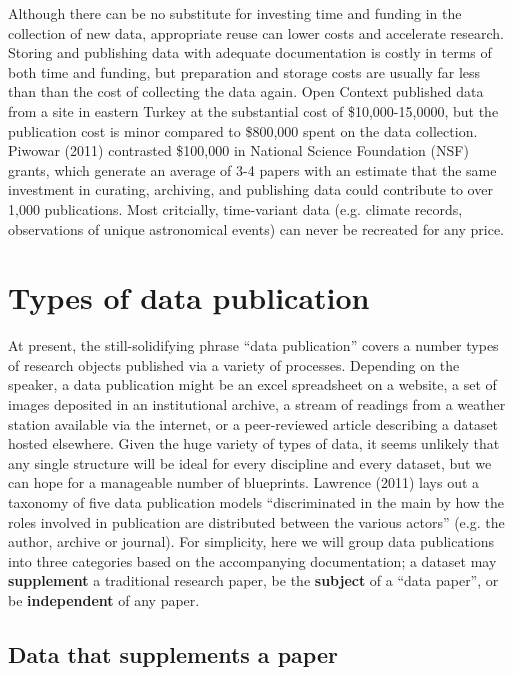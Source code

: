 \documentclass[10pt,twocolumn]{article}
\begin{document}
Although there can be no substitute for investing time and funding in the collection of new data, appropriate reuse can lower costs and accelerate research. 
Storing and publishing data with adequate documentation is costly in terms of both time and funding, but preparation and storage costs are usually far less than than the cost of collecting the data again.
Open Context published data from a site in eastern Turkey at the substantial cost of \$10,000-15,0000, but the publication cost is minor compared to \$800,000 spent on the data collection.\cite{kansa_we_2014}
Piwowar (2011) contrasted \$100,000 in National Science Foundation (NSF) grants, which generate an average of 3-4 papers with an estimate that the same investment in curating, archiving, and publishing data could contribute to over 1,000 publications.\cite{piwowar_data_2011}
Most critcially, time-variant data (e.g. climate records, observations of unique astronomical events) can never be recreated for any price.\cite{gray_online_2002}



\section*{Types of data publication}\label{types-of-data-publication}

At present, the still-solidifying phrase ``data publication'' covers a number types of research objects published via a variety of processes.
Depending on the speaker, a data publication might be an excel spreadsheet on a website, a set of images deposited in an institutional archive, a stream of readings from a weather station available via the internet, or a peer-reviewed article describing a dataset hosted elsewhere.
Given the huge variety of types of data, it seems unlikely that any single structure will be ideal for every discipline and every dataset, but we can hope for a manageable number of blueprints.
Lawrence (2011) lays out a taxonomy of five data publication models ``discriminated in the main by how the roles involved in publication are distributed between the various actors'' (e.g. the author, archive or journal).\cite{lawrence_data_2011}
For simplicity, here we will group data publications into three categories based on the accompanying documentation; a dataset may \textbf{supplement} a traditional research paper, be the \textbf{subject} of a ``data paper'', or be \textbf{independent} of any paper.

\subsection*{Data that supplements a paper}\label{paper-supplement-data}
\end{document}
